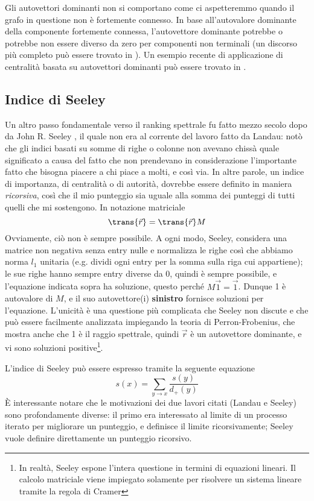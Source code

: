 Gli autovettori dominanti non si comportano come ci aspetteremmo quando il grafo in questione non è fortemente connesso. In base all'autovalore dominante della componente fortemente connessa, l'autovettore dominante potrebbe o potrebbe non essere diverso da zero per componenti non terminali (un discorso più completo può essere trovato in \cite{autovalori}).
Un esempio recente di applicazione di centralità basata su autovettori dominanti può essere trovato in \cite{calcio}.
\subsection{Indice di Seeley}
Un altro passo fondamentale verso il ranking spettrale fu fatto mezzo secolo dopo da John R. Seeley \cite{seeley}
, il quale non era al corrente del lavoro fatto da Landau: notò che gli indici basati su somme di righe o colonne non avevano chissà quale significato a causa del fatto che non prendevano in considerazione l'importante fatto che bisogna piacere a chi piace a molti, e così via. In altre parole, un indice di importanza, di centralità o di autorità, dovrebbe essere definito in maniera \textit{ricorsiva}, così che il mio punteggio sia uguale alla somma dei punteggi di tutti quelli che mi sostengono. In notazione matriciale
\begin{equation}
	\trans{\vec{r}} = \trans{\vec{r}}M
\end{equation}
Ovviamente, ciò non è sempre possibile. A ogni modo, Seeley, considera una matrice non negativa senza entry nulle e normalizza le righe così che abbiamo norma $l_1$ unitaria (e.g. dividi ogni entry per la somma sulla riga cui appartiene); le sue righe hanno sempre entry diverse da 0, quindi è sempre possibile, e l'equazione indicata sopra ha soluzione, questo perché $M\vec{1} = \vec{1}$. Dunque 1 è autovalore di $M$, e il suo autovettore(i) \textbf{sinistro} fornisce soluzioni per l'equazione. L'unicità è una questione più complicata che Seeley non discute e che può essere facilmente analizzata impiegando la teoria di Perron-Frobenius, che mostra anche che 1 è il raggio spettrale, quindi $\vec{r}$ è  un autovettore dominante, e vi sono soluzioni positive\footnote{In realtà, Seeley espone l'intera questione in termini di equazioni lineari. Il calcolo matriciale viene impiegato solamente per risolvere un sistema lineare tramite la regola di Cramer}.

L'indice di Seeley può essere espresso tramite la seguente equazione
\begin{equation}
	s(x) = \sum_{y \to x}{\frac{s(y)}{d_+(y)}}
\end{equation}
È interessante notare che le motivazioni dei due lavori citati (Landau e Seeley) sono profondamente diverse: il primo era interessato al limite di un processo iterato per migliorare un punteggio, e definisce il limite ricorsivamente; Seeley vuole definire direttamente un punteggio ricorsivo.

